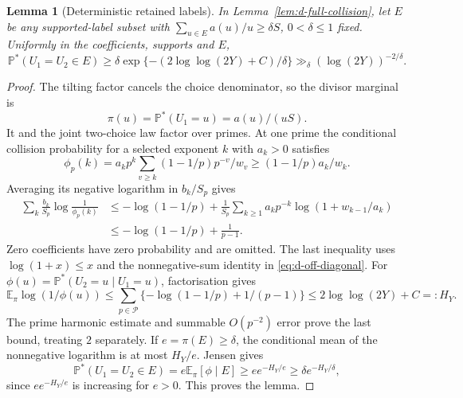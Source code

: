 \documentclass[11pt]{article}
\newtheorem{lemma}[theorem]{Lemma}
\theoremstyle{definition}
\newcommand{\E}{\mathbb E}
\newcommand{\Prob}{\mathbb P}
\theoremstyle{remark}
\numberwithin{equation}{section}
\begin{document}
\begin{lemma}[Deterministic retained labels]\label{lem:d-truncated}
In Lemma~\ref{lem:d-full-collision}, let $E$ be any supported-label subset with
$\sum_{u\in E}a(u)/u\ge\delta S$, $0<\delta\le1$ fixed. Uniformly in the coefficients, supports and $E$,
\begin{equation}\label{eq:d-truncated-collision}
 \Prob^*(U_1=U_2\in E)
 \ge\delta\exp\{-(2\log\log(2Y)+C)/\delta\}
 \gg_\delta(\log(2Y))^{-2/\delta}.
\end{equation}
\end{lemma}
\begin{proof}
The tilting factor cancels the choice denominator, so the divisor marginal is
\begin{equation}\label{eq:d-raw-marginal}
 \pi(u)=\Prob^*(U_1=u)=a(u)/(uS).
\end{equation}
It and the joint two-choice law factor over primes. At one prime the conditional collision probability
for a selected exponent $k$ with $a_k>0$ satisfies
\begin{equation}\label{eq:d-conditional-collision}
 \phi_p(k)=a_kp^k\sum_{v\ge k}(1-1/p)p^{-v}/w_v
 \ge(1-1/p)a_k/w_k.
\end{equation}
Averaging its negative logarithm in $b_k/S_p$ gives
\begin{equation}\label{eq:d-collision-log}
\begin{aligned}
 \sum_k\frac{b_k}{S_p}\log\frac1{\phi_p(k)}
 &\le-\log(1-1/p)+\frac1{S_p}\sum_{k\ge1}a_kp^{-k}\log(1+w_{k-1}/a_k)\\
 &\le-\log(1-1/p)+\frac1{p-1}.
\end{aligned}
\end{equation}
Zero coefficients have zero probability and are omitted. The last inequality uses
$\log(1+x)\le x$ and the nonnegative-sum identity in \eqref{eq:d-off-diagonal}.
For $\phi(u)=\Prob^*(U_2=u\mid U_1=u)$, factorisation gives
\begin{equation}\label{eq:d-harmonic-entropy}
 \E_\pi\log(1/\phi(u))\le
 \sum_{p\in\mathcal P}\{-\log(1-1/p)+1/(p-1)\}
 \le2\log\log(2Y)+C=:H_Y.
\end{equation}
The prime harmonic estimate and summable $O(p^{-2})$ error prove the last bound, treating $2$ separately.
If $e=\pi(E)\ge\delta$, the conditional mean of the nonnegative logarithm is at most $H_Y/e$.
Jensen gives
\begin{equation}\label{eq:d-truncated-jensen}
 \Prob^*(U_1=U_2\in E)=e\E_\pi[\phi\mid E]
 \ge e e^{-H_Y/e}\ge\delta e^{-H_Y/\delta},
\end{equation}
since $e e^{-H_Y/e}$ is increasing for $e>0$. This proves the lemma.
\end{proof}
\end{document}
